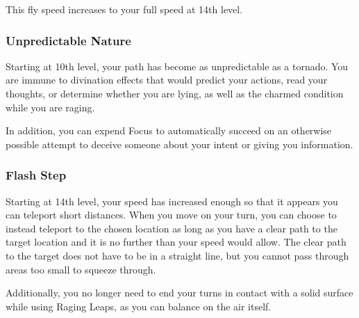 This fly speed increases to your full speed at 14th level.

\subsubsection{Unpredictable Nature}
Starting at 10th level, your path has become as unpredictable as a tornado. You are immune to divination effects that would predict your actions, read your thoughts, or determine whether you are lying, as well as the charmed condition while you are raging.

In addition, you can expend Focus to automatically succeed on an otherwise possible attempt to deceive someone about your intent or giving you information.

\subsubsection{Flash Step}
Starting at 14th level, your speed has increased enough so that it appears you can teleport short distances. When you move on your turn, you can choose to instead teleport to the chosen location as long as you have a clear path to the target location and it is no further than your speed would allow. The clear path to the target does not have to be in a straight line, but you cannot pass through areas too small to squeeze through.

Additionally, you no longer need to end your turns in contact with a solid surface while using Raging Leaps, as you can balance on the air itself.